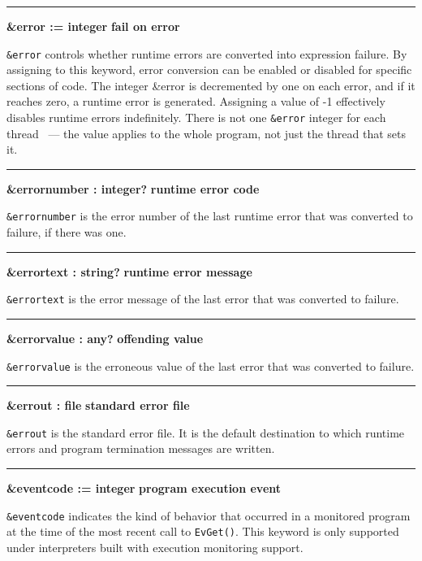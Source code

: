 \bigskip\hrule\vspace{0.1cm}
\noindent
{\bf \&error := integer } \hfill {\bf fail on error}

\noindent
{}\texttt{\&error} controls whether
runtime errors are converted into expression failure. By assigning to
this keyword, error conversion can be enabled or disabled for specific
sections of code. The integer \&error is decremented by one on each
error, and if it reaches zero, a runtime error is generated. Assigning
a value of -1 effectively disables runtime errors indefinitely. 
There is not one \texttt{\&error} integer for each thread \ConcurrencyIssue\
--- the value applies to the whole program, not just the thread that sets it.

\bigskip\hrule\vspace{0.1cm}
\noindent
{\bf \&errornumber : integer? } \hfill {\bf runtime error code}

\noindent
\texttt{\&errornumber} is the error number of the last runtime error
that was converted to failure, if there was one.

\bigskip\hrule\vspace{0.1cm}
\noindent
{\bf \&errortext : string? } \hfill {\bf runtime error message}

\noindent
{}\texttt{\&errortext} is the error
message of the last error that was converted to failure.

\bigskip\hrule\vspace{0.1cm}
\noindent
{\bf \&errorvalue : any? } \hfill {\bf offending value}

\noindent
\texttt{\&errorvalue} is the erroneous value of the last error that was
converted to failure.

\bigskip\hrule\vspace{0.1cm}
\noindent
{\bf \&errout : file } \hfill {\bf standard error file}

\noindent
{}\texttt{\&errout} is the standard
error file. It is the default destination to which runtime errors and
program termination messages are written.

\bigskip\hrule\vspace{0.1cm}
\noindent
{\bf \&eventcode := integer } \hfill {\bf program execution event}

\noindent
{}\texttt{\&eventcode} indicates the
kind of behavior that occurred in a monitored program at the time of
the most recent call to \texttt{EvGet()}. This keyword is only
supported under interpreters built with execution monitoring support.

